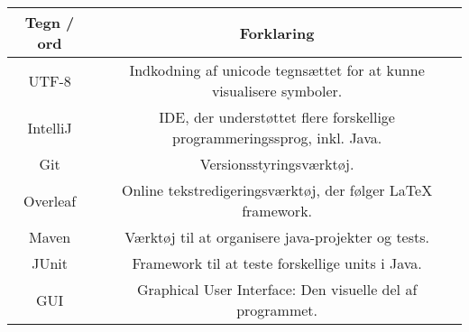 \begin{flushleft}
\begin{tabular}{ | c | c | } 
\hline
Tegn / ord & Forklaring \\ 
\hline
UTF-8 & Indkodning af unicode tegnsættet for at kunne visualisere symboler. \\ 
\hline
IntelliJ & IDE, der understøttet flere forskellige programmeringssprog, inkl. Java. \\ 
\hline
Git & Versionsstyringsværktøj. \\ 
\hline
Overleaf & Online tekstredigeringsværktøj, der følger LaTeX framework. \\ 
\hline
Maven & Værktøj til at organisere java-projekter og tests. \\ 
\hline
JUnit & Framework til at teste forskellige units i Java. \\ 
\hline
GUI & Graphical User Interface: Den visuelle del af programmet. \\ 
\hline
 
\hline
\end{tabular}

\end{flushleft}